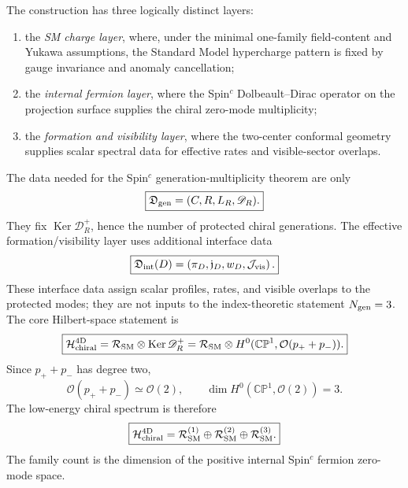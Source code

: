 \documentclass[aps,prd,preprint,notitlepage,nofootinbib,superscriptaddress,floatfix]{revtex4-2}
\newcommand{\Ker}{\operatorname{Ker}}
\newcommand{\cH}{\mathcal H}
\newcommand{\cO}{\mathcal O}
\newcommand{\cR}{\mathcal R}
\newcommand{\CP}{\mathbb{CP}}
\newcommand{\scrD}{\mathscr D}
\theoremstyle{remark}
\begin{document}
The construction has three logically distinct layers:
\begin{enumerate}
\item the \emph{SM charge layer}, where, under the minimal one-family field-content and Yukawa assumptions, the Standard Model hypercharge pattern is fixed by gauge invariance and anomaly cancellation;
\item the \emph{internal fermion layer}, where the Spin\(^c\) Dolbeault--Dirac operator on the projection surface supplies the chiral zero-mode multiplicity;
\item the \emph{formation and visibility layer}, where the two-center conformal geometry supplies scalar spectral data for effective rates and visible-sector overlaps.
\end{enumerate}
The data needed for the Spin\(^c\) generation-multiplicity theorem are only
\begin{equation}
\boxed{
\mathfrak D_{\rm gen}
=
(C,R,L_R,\scrD_R).
}
\label{eq:generation_theorem_data}
\end{equation}
They fix \(\Ker\scrD_R^+\), hence the number of protected chiral generations.
The effective formation/visibility layer uses additional interface data
\begin{equation}
\boxed{
\mathfrak D_{\rm int}(D)
=
\left(
\pi_D,\mathfrak j_D,w_D,\mathcal J_{\rm vis}
\right).
}
\label{eq:interface_data}
\end{equation}
These interface data assign scalar profiles, rates, and visible overlaps to the protected modes; they are not inputs to the index-theoretic statement \(N_{\rm gen}=3\).
The core Hilbert-space statement is
\begin{equation}
\boxed{
\cH_{\rm chiral}^{\rm 4D}
=
\cR_{\rm SM}
\otimes
\Ker\scrD_R^+
=
\cR_{\rm SM}
\otimes
H^0(\CP^1,\cO(p_+ + p_-)).
}
\label{eq:core_hilbert}
\end{equation}
Since \(p_+ + p_-\) has degree two,
\begin{equation}
\cO(p_+ + p_-)\simeq \cO(2),
\qquad
\dim H^0(\CP^1,\cO(2))=3.
\label{eq:core_dimension}
\end{equation}
The low-energy chiral spectrum is therefore
\begin{equation}
\boxed{
\cH_{\rm chiral}^{\rm 4D}
=
\cR_{\rm SM}^{(1)}
\oplus
\cR_{\rm SM}^{(2)}
\oplus
\cR_{\rm SM}^{(3)}.
}
\label{eq:three_families}
\end{equation}
The family count is the dimension of the positive internal Spin\(^c\) fermion zero-mode space.
\end{document}

